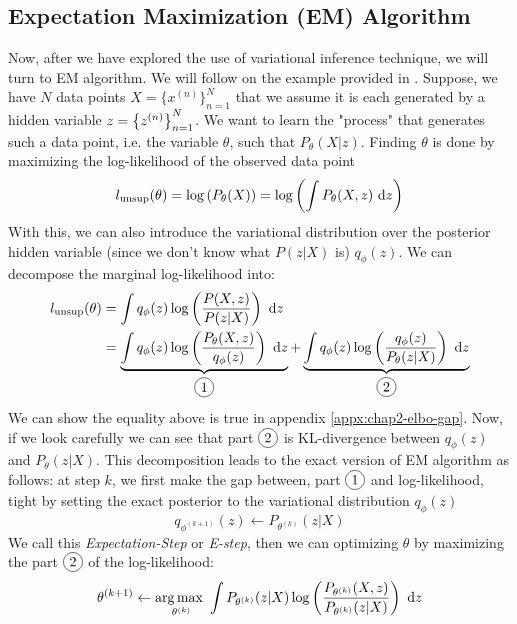 \subsection{Expectation Maximization (EM) Algorithm}
\label{sec:chap2-em-algo}
Now, after we have explored the use of variational inference technique, we will turn to EM algorithm. We will follow on the example provided in \cite{fellows2019virel}. Suppose, we have $N$ data points $X = \{x^{(n)}\}^N_{n=1}$ that we assume it is each generated by a hidden variable $z = \left\{ z^{(n)} \right\}^N_{n=1}$. We want to learn the "process" that generates such a data point, i.e. the variable $\theta$, such that $P_{\theta}(X | z)$. Finding $\theta$ is done by maximizing the log-likelihood of the observed data point
\begin{equation}
    l_{\text{unsup}}(\theta) = \log \left( P_{\theta}(X) \right) = \log\left( \int P_{\theta}(X, z) \ \mathrm{d} z \right)
\end{equation}
With this, we can also introduce the variational distribution over the posterior hidden variable (since we don't know what $P(z | X)$ is) $q_{\phi}(z)$. We can decompose the marginal log-likelihood into:
\begin{equation}
    \begin{aligned}
        l_{\text{unsup}}(\theta) &= \int q_{\phi}(z) \log \bracka{\frac{P(X, z)}{P(z | X)}} \dby z \\
        &= \underbrace{\int q_{\phi}(z) \log \bracka{\frac{P_{\theta}(X, z)}{q_{\phi}(z)}} \dby z}_{\circled{1}} + \underbrace{\int q_{\phi}(z) \log \bracka{\frac{q_{\phi}(z)}{P_{\theta}(z | X)}} \dby z}_{\circled{2}}
    \end{aligned}
\end{equation}
We can show the equality above is true in appendix \ref{appx:chap2-elbo-gap}. Now, if we look carefully we can see that part $\circled{2}$ is KL-divergence between $q_{\phi}(z)$ and $P_{\theta}(z | X)$. This decomposition leads to the exact version of EM algorithm as follows: at step $k$, we first make the gap between, part $\circled{1}$ and log-likelihood, tight by setting the exact posterior to the variational distribution $q_{\phi}(z)$
\begin{equation}
    q_{\phi^{(k+1)}}(z) \leftarrow P_{\theta^{(k)}}(z | X)
\end{equation}
We call this \textit{Expectation-Step} or \textit{E-step}, then we can optimizing $\theta$ by maximizing the part $\circled{2}$ of the log-likelihood:
\begin{equation}
    \theta^{(k+1)} \leftarrow \underset{\theta^{(k)}}{\arg\max \ }  \int P_{\theta^{(k)}}(z | X) \log \left( \frac{P_{\theta^{(k)}}(X, z)}{P_{\theta^{(k)}}(z | X)} \right) \ \mathrm{d} z 
\end{equation}
